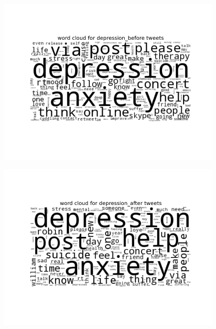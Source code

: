 \documentclass[11pt, oneside]{article}   	%
\begin{document}
 \begin{figure}
 \includegraphics[width=\textwidth]{../figures/depression_before.png}
 \centering
 \end{figure}

 \begin{figure}
 \includegraphics[width=\textwidth]{../figures/depression_after.png}
 \centering
 \end{figure}
\end{document}
